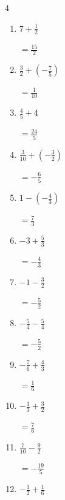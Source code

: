\begin{multicols}{4}
\begin{enumerate}
        $\displaystyle =-\frac{47}{42}$

  \item $\displaystyle 7 + \frac{1}{2}$

        $\displaystyle =\frac{15}{2}$

\columnbreak %

  \item $\displaystyle \frac{3}{2} + \left(-\frac{7}{5}\right)$

        $\displaystyle =\frac{1}{10}$

  \item $\displaystyle \frac{4}{5} + 4$

        $\displaystyle =\frac{24}{5}$

  \item $\displaystyle \frac{3}{10} + \left(-\frac{3}{2}\right)$

        $\displaystyle =-\frac{6}{5}$

  \item $\displaystyle 1 - \left(-\frac{4}{3}\right)$

        $\displaystyle =\frac{7}{3}$

  \item $\displaystyle -3 + \frac{5}{3}$

        $\displaystyle =-\frac{4}{3}$

  \item $\displaystyle -1 - \frac{3}{2}$

        $\displaystyle =-\frac{5}{2}$

  \item $\displaystyle -\frac{5}{4} - \frac{5}{4}$

        $\displaystyle =-\frac{5}{2}$

  \item $\displaystyle -\frac{7}{6} + \frac{4}{3}$

        $\displaystyle =\frac{1}{6}$

  \item $\displaystyle -\frac{1}{3} + \frac{3}{2}$

        $\displaystyle =\frac{7}{6}$

  \item $\displaystyle \frac{7}{10} - \frac{9}{2}$

        $\displaystyle =-\frac{19}{5}$

\columnbreak %

\resetques

  \item $\displaystyle -\frac{1}{2} + \frac{1}{6}$


\end{enumerate}
\end{multicols}
